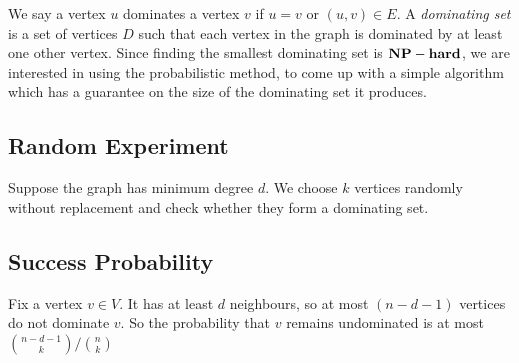 We say a vertex $u$ dominates a vertex $v$ if $u=v$ or $(u,v) \in E$. A \emph{dominating set} is 
a set of vertices \(D\) such that each vertex in the graph is dominated by at least one other vertex. 
Since finding the smallest dominating set is $\mathbf{NP-hard}$, we are interested in using the probabilistic method, to 
come up with a simple algorithm which has a guarantee on the size of the dominating set it produces.


\begin{center}
\end{center}

\subsection{Random Experiment}
Suppose the graph has minimum degree \(d\). We choose \(k\) vertices randomly without replacement and check 
whether they form a dominating set. 


\subsection{Success Probability}
Fix a vertex $v\in V$. It has at least $d$ neighbours, 
so at most $(n-d-1)$ vertices do not dominate $v$. So the probability that $v$ remains undominated 
is at most $\binom{n-d-1}{k}/\binom{n}{k}$

